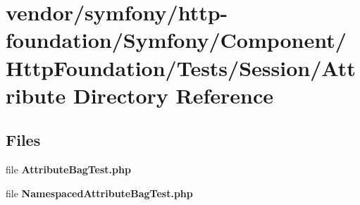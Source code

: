 \section{vendor/symfony/http-\/foundation/\+Symfony/\+Component/\+Http\+Foundation/\+Tests/\+Session/\+Attribute Directory Reference}
\label{dir_24d23ff98ac5bc0857a1f31fdfec91e2}
\subsection*{Files}
\begin{DoxyCompactItemize}
\item 
file {\bf Attribute\+Bag\+Test.\+php}
\item 
file {\bf Namespaced\+Attribute\+Bag\+Test.\+php}
\end{DoxyCompactItemize}
